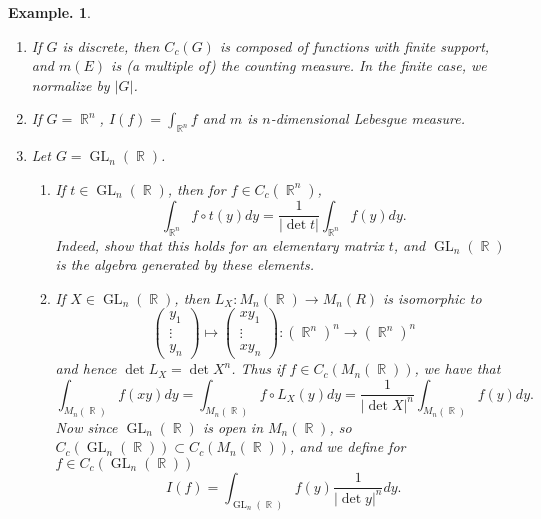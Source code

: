 \documentclass[11pt, a4paper]{memoir}
\DeclareMathOperator{\R}{{\mathbb{R}}}
\theoremstyle{change}
\theoremstyle{plain}
\theoremstyle{nonumberplain}
\newtheorem{example}{Example.}
\DeclareMathOperator{\GL}{GL}
\numberwithin{equation}{section}
\begin{document}
\begin{example}
    \begin{enumerate}[nl,r]
        \item If $G$ is discrete, then $C_c(G)$ is composed of functions with finite support, and $m(E)$ is (a multiple of) the counting measure.
            In the finite case, we normalize by $|G|$.
        \item If $G=\R^n$, $I(f)=\int_{\R^n}f$ and $m$ is $n$-dimensional Lebesgue measure.
        \item Let $G=\GL_n(\R)$.
            \begin{enumerate}[nl,a]
                \item If $t\in\GL_n(\R)$, then for $f\in C_c(\R^n)$,
                    \begin{equation*}
                        \int_{\R^n}f\circ t(y)dy=\frac{1}{|\det t|}\int_{\R^n}f(y)dy.
                    \end{equation*}
                    Indeed, show that this holds for an elementary matrix $t$, and $\GL_n(\R)$ is the algebra generated by these elements.
                \item If $X\in\GL_n(\R)$, then $L_X:M_n(\R)\to M_n(R)$ is isomorphic to
                    \begin{equation*}
                        \begin{pmatrix}y_1\\\vdots\\y_n\end{pmatrix}\mapsto\begin{pmatrix}xy_1\\\vdots\\xy_n\end{pmatrix}:(\R^n)^n\to(\R^n)^n
                    \end{equation*}
                    and hence $\det L_X=\det X^n$.
                    Thus if $f\in C_c(M_n(\R))$, we have that
                    \begin{equation*}
                        \int_{M_n(\R)}f(xy)dy=\int_{M_n(\R)}f\circ L_X(y)dy=\frac{1}{|\det X|^n}\int_{M_n(\R)}f(y)dy.
                    \end{equation*}
                    Now since $\GL_n(\R)$ is open in $M_n(\R)$, so $C_c(\GL_n(\R))\subset C_c(M_n(\R))$, and we define for $f\in C_c(\GL_n(\R))$
                    \begin{equation*}
                        I(f)=\int_{\GL_n(\R)}f(y)\frac{1}{|\det y|^n}dy.
                    \end{equation*}

\end{enumerate}
\end{enumerate}
\end{example}
\end{document}
